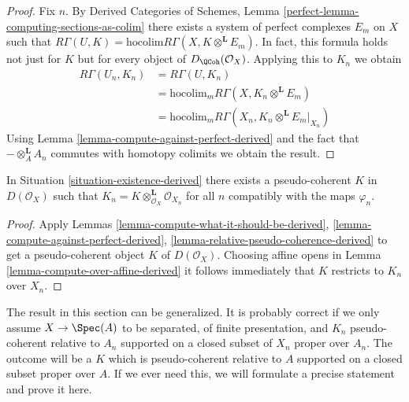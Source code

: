 \begin{proof}
Fix $n$. By Derived Categories of Schemes, Lemma
\ref{perfect-lemma-computing-sections-as-colim}
there exists a system of perfect complexes $E_m$
on $X$ such that
$R\Gamma(U, K) = \text{hocolim} R\Gamma(X, K \otimes^\mathbf{L} E_m)$.
In fact, this formula holds not just for $K$ but for every object of
$D_\QCoh(\mathcal{O}_X)$.
Applying this to $K_n$
we obtain
\begin{align*}
R\Gamma(U_n, K_n)
& =
R\Gamma(U, K_n) \\
& =
\text{hocolim}_m R\Gamma(X, K_n \otimes^\mathbf{L} E_m) \\
& =
\text{hocolim}_m R\Gamma(X_n, K_n \otimes^\mathbf{L} E_m|_{X_n})
\end{align*}
Using Lemma \ref{lemma-compute-against-perfect-derived}
and the fact that $- \otimes_A^\mathbf{L} A_n$
commutes with homotopy colimits we obtain the result.
\end{proof}

\begin{theorem}
\label{theorem-existence-derived}
In Situation \ref{situation-existence-derived}
there exists a pseudo-coherent $K$ in $D(\mathcal{O}_X)$
such that $K_n = K \otimes_{\mathcal{O}_X}^\mathbf{L} \mathcal{O}_{X_n}$
for all $n$ compatibly with the maps $\varphi_n$.
\end{theorem}

\begin{proof}
Apply Lemmas \ref{lemma-compute-what-it-should-be-derived},
\ref{lemma-compute-against-perfect-derived},
\ref{lemma-relative-pseudo-coherence-derived}
to get a pseudo-coherent object $K$ of $D(\mathcal{O}_X)$.
Choosing affine opens in Lemma
\ref{lemma-compute-over-affine-derived}
it follows immediately that $K$ restricts to $K_n$ over $X_n$.
\end{proof}

\begin{remark}
\label{remark-correct-generality}
The result in this section can be generalized. It is probably correct
if we only assume $X \to \Spec(A)$ to be separated, of finite presentation,
and $K_n$ pseudo-coherent relative to $A_n$ supported on a closed
subset of $X_n$ proper over $A_n$. The outcome will be a $K$ which
is pseudo-coherent relative to $A$ supported on a closed subset
proper over $A$. If we ever need this, we will
formulate a precise statement and prove it here.
\end{remark}






